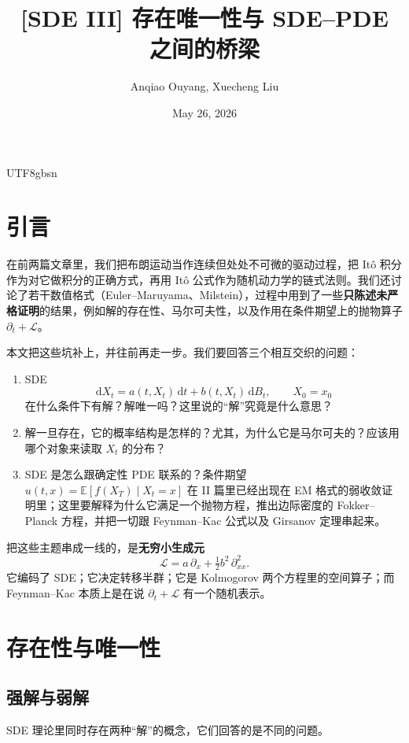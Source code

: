 \documentclass{article}
\title{[SDE III] 存在唯一性与 SDE--PDE 之间的桥梁}
\author{Anqiao Ouyang, Xuecheng Liu}
\date{May 26, 2026}
\theoremstyle{plain}
\theoremstyle{definition}
\begin{document}
\begin{CJK*}{UTF8}{gbsn}

\maketitle

\section{引言}

在前两篇文章里，我们把布朗运动当作连续但处处不可微的驱动过程，把 It\^o 积分作为对它做积分的正确方式，再用 It\^o 公式作为随机动力学的链式法则。我们还讨论了若干数值格式（Euler--Maruyama、Milstein），过程中用到了一些\textbf{只陈述未严格证明}的结果，例如解的存在性、马尔可夫性，以及作用在条件期望上的抛物算子 $\partial_t+\mathcal L$。

本文把这些坑补上，并往前再走一步。我们要回答三个相互交织的问题：
\begin{enumerate}
    \item SDE
    \[
      \mathrm{d}X_t=a(t,X_t)\,\mathrm{d}t+b(t,X_t)\,\mathrm{d}B_t,\qquad X_0=x_0
    \]
    在什么条件下有解？解唯一吗？这里说的“解”究竟是什么意思？
    \item 解一旦存在，它的概率结构是怎样的？尤其，为什么它是马尔可夫的？应该用哪个对象来读取 $X_t$ 的分布？
    \item SDE 是怎么跟确定性 PDE 联系的？条件期望 $u(t,x)=\mathbb{E}[f(X_T)\mid X_t=x]$ 在 II 篇里已经出现在 EM 格式的弱收敛证明里；这里要解释为什么它满足一个抛物方程，推出边际密度的 Fokker--Planck 方程，并把一切跟 Feynman--Kac 公式以及 Girsanov 定理串起来。
\end{enumerate}

把这些主题串成一线的，是\textbf{无穷小生成元}
\[
  \mathcal L=a\,\partial_x+\tfrac12 b^2\,\partial^2_{xx}.
\]
它编码了 SDE；它决定转移半群；它是 Kolmogorov 两个方程里的空间算子；而 Feynman--Kac 本质上是在说 $\partial_t+\mathcal L$ 有一个随机表示。

\section{存在性与唯一性}

\subsection{强解与弱解}

SDE 理论里同时存在两种“解”的概念，它们回答的是不同的问题。


\end{CJK*}
\end{document}
